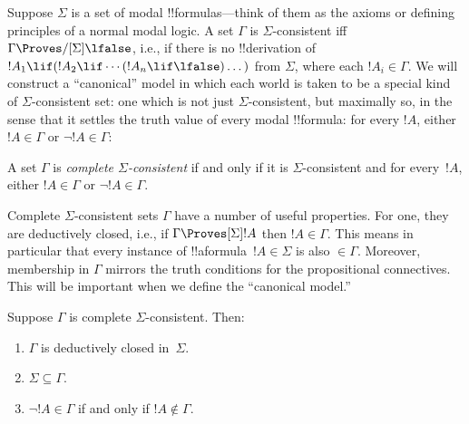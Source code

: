 \documentclass[../../../include/open-logic-section]{subfiles}
\begin{document}

Suppose $\Sigma$ is a set of modal !!{formula}s---think of them as the
axioms or defining principles of a normal modal logic. A set $\Gamma$
is $\Sigma$-consistent iff $\Gamma \Proves/[\Sigma] \lfalse$, i.e., if
there is no !!{derivation} of~$!A_1 \lif (!A_2 \lif \cdots (!A_n \lif
\lfalse)\dots)$ from $\Sigma$, where each $!A_i \in \Gamma$. We will
construct a ``canonical'' model in which each world is taken to be a
special kind of $\Sigma$-consistent set: one which is not just
$\Sigma$-consistent, but maximally so, in the sense that it settles
the truth value of every modal !!{formula}: for every $!A$, either $!A
\in \Gamma$ or $\lnot !A \in \Gamma$:

\begin{defn}
  A set $\Gamma$ is \emph{complete $\Sigma$-consistent} if and
  only if it is $\Sigma$-consistent and for every~$!A$, either
  $!A \in \Gamma$ or $\lnot !A \in \Gamma$.
\end{defn}

Complete $\Sigma$-consistent sets $\Gamma$ have a number of useful
properties. For one, they are deductively closed, i.e., if $\Gamma
\Proves[\Sigma] !A$ then $!A \in \Gamma$. This means in particular
that every instance of !!a{formula}~$!A \in \Sigma$ is also $\in
\Gamma$. Moreover, membership in $\Gamma$ mirrors the truth conditions
for the propositional connectives. This will be important when we
define the ``canonical model.''

\begin{prop}
  Suppose $\Gamma$ is complete $\Sigma$-consistent. Then:
  \begin{enumerate}
  \item {}%
    $\Gamma$ is deductively closed in~$\Sigma$.
  \item {}%
    $\Sigma \subseteq \Gamma$.
  \item {}%
    $\lnot!A \in \Gamma$ if and only if $!A \notin
    \Gamma$.
  \end{enumerate}
\end{prop}
\end{document}
